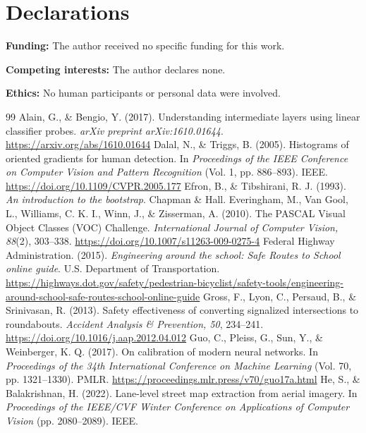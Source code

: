 \documentclass[11pt]{article}
\begin{document}
\section*{Declarations}
\noindent\textbf{Funding:} The author received no specific funding for this work.\par
\noindent\textbf{Competing interests:} The author declares none.\par
\noindent\textbf{Ethics:} No human participants or personal data were involved.

\begin{thebibliography}{99}
 Alain, G., \& Bengio, Y. (2017). Understanding intermediate layers using linear classifier probes. \emph{arXiv preprint arXiv:1610.01644}. \url{https://arxiv.org/abs/1610.01644}
 Dalal, N., \& Triggs, B. (2005). Histograms of oriented gradients for human detection. In \emph{Proceedings of the IEEE Conference on Computer Vision and Pattern Recognition} (Vol. 1, pp. 886--893). IEEE. \url{https://doi.org/10.1109/CVPR.2005.177}
 Efron, B., \& Tibshirani, R. J. (1993). \emph{An introduction to the bootstrap}. Chapman \& Hall.
 Everingham, M., Van Gool, L., Williams, C. K. I., Winn, J., \& Zisserman, A. (2010). The PASCAL Visual Object Classes (VOC) Challenge. \emph{International Journal of Computer Vision, 88}(2), 303--338. \url{https://doi.org/10.1007/s11263-009-0275-4}
 Federal Highway Administration. (2015). \emph{Engineering around the school: Safe Routes to School online guide}. U.S. Department of Transportation. \url{https://highways.dot.gov/safety/pedestrian-bicyclist/safety-tools/engineering-around-school-safe-routes-school-online-guide}
 Gross, F., Lyon, C., Persaud, B., \& Srinivasan, R. (2013). Safety effectiveness of converting signalized intersections to roundabouts. \emph{Accident Analysis \& Prevention, 50}, 234--241. \url{https://doi.org/10.1016/j.aap.2012.04.012}
 Guo, C., Pleiss, G., Sun, Y., \& Weinberger, K. Q. (2017). On calibration of modern neural networks. In \emph{Proceedings of the 34th International Conference on Machine Learning} (Vol. 70, pp. 1321--1330). PMLR. \url{https://proceedings.mlr.press/v70/guo17a.html}
 He, S., \& Balakrishnan, H. (2022). Lane-level street map extraction from aerial imagery. In \emph{Proceedings of the IEEE/CVF Winter Conference on Applications of Computer Vision} (pp. 2080--2089). IEEE.

\end{thebibliography}
\end{document}
